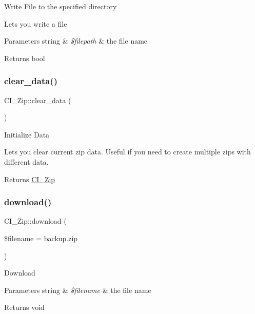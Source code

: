 Write File to the specified directory

Lets you write a file


\begin{DoxyParams}[1]{Parameters}
string & {\em \$filepath} & the file name \\
\hline
\end{DoxyParams}
\begin{DoxyReturn}{Returns}
bool 
\end{DoxyReturn}
\mbox{\label{class_c_i___zip_a570efcbd88d425ecb7f06f35ef68bf80}} 
\subsubsection{\texorpdfstring{clear\+\_\+data()}{clear\_data()}}
{\footnotesize\ttfamily C\+I\+\_\+\+Zip\+::clear\+\_\+data (\begin{DoxyParamCaption}{ }\end{DoxyParamCaption})}

Initialize Data

Lets you clear current zip data. Useful if you need to create multiple zips with different data.

\begin{DoxyReturn}{Returns}
\mbox{\hyperlink{class_c_i___zip}{C\+I\+\_\+\+Zip}} 
\end{DoxyReturn}
\mbox{\label{class_c_i___zip_adbaee3f609125a672af00ed0f9706944}} 
\subsubsection{\texorpdfstring{download()}{download()}}
{\footnotesize\ttfamily C\+I\+\_\+\+Zip\+::download (\begin{DoxyParamCaption}\item[{}]{\$filename = {\ttfamily \textquotesingle{}backup.zip\textquotesingle{}} }\end{DoxyParamCaption})}

Download


\begin{DoxyParams}[1]{Parameters}
string & {\em \$filename} & the file name \\
\hline
\end{DoxyParams}
\begin{DoxyReturn}{Returns}
void 
\end{DoxyReturn}
\mbox{\label{class_c_i___zip_a8c51b65277a512961ece0d155643badf}} 
